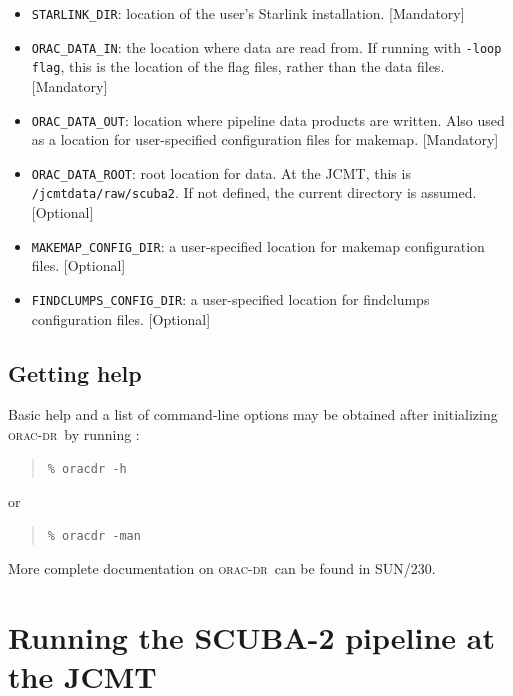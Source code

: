 \documentclass[twoside,11pt]{article}
\newcommand{\xref}[3]{#1}
\newcommand{\xlabel}[1]{}
\renewcommand{\_}{\texttt{\symbol{95}}}
\newenvironment{myquote}{\begin{quote}\begin{small}}{\end{small}\end{quote}}
\newcommand{\oracdr}{\textsc{orac-dr}}
\newcommand{\oracsun}{\xref{SUN/230}{sun230}{}}
\newcommand{\task}[1]{\textsf{#1}}
\begin{document}
\begin{itemize}

\item \verb+STARLINK_DIR+: location of the user's Starlink
  installation. [Mandatory]

\item \verb+ORAC_DATA_IN+: the location where data are read from. If
  running with \verb+-loop flag+, this is the location of the flag
  files, rather than the data files. [Mandatory]

\item \verb+ORAC_DATA_OUT+: location where pipeline data products are
  written. Also used as a location for user-specified configuration
  files for \task{makemap}. [Mandatory]

\item \verb+ORAC_DATA_ROOT+: root location for data. At the JCMT,
  this is \verb+/jcmtdata/raw/scuba2+. If not defined, the current
  directory is assumed. [Optional]

\item \verb+MAKEMAP_CONFIG_DIR+: a user-specified location for
  \task{makemap} configuration files. [Optional]

\item \verb+FINDCLUMPS_CONFIG_DIR+: a user-specified location for
  \task{findclumps} configuration files. [Optional]

\end{itemize}

\subsection{Getting help}

Basic help and a list of command-line options may be obtained after
initializing \oracdr\ by running :
\begin{myquote}
\begin{verbatim}
% oracdr -h
\end{verbatim}
\end{myquote}
or
\begin{myquote}
\begin{verbatim}
% oracdr -man
\end{verbatim}
\end{myquote}

More complete documentation on \oracdr\ can be found in \oracsun.

\section{\xlabel{runpipeline}Running the SCUBA-2 pipeline at the JCMT\label{se:runpipe}}
\end{document}
